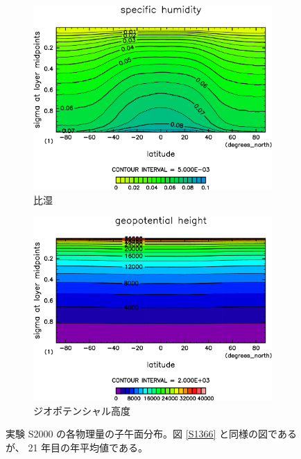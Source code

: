 \documentclass[body]{subfiles}
\begin{document}
\begin{figure}[t]
\begin{subfigure}{.4\textwidth}
		\includegraphics[width=\textwidth]{S2000/QH2OVap,time=7300:7665-crop-rotate.pdf}
		\caption{比湿\hmu*{[kg/kg]}}\label{S2000比湿}
	\end{subfigure}
	\begin{subfigure}{.4\textwidth}
		\centering
		\includegraphics[width=\textwidth]{S2000/Height,time=7300:7665-crop-rotate.pdf}
		\caption{ジオポテンシャル高度\hmu*{[m]}}\label{S2000ジオポテンシャル高度}
	\end{subfigure}
	\caption[実験 S2000 の各物理量の子午面分布]{
		実験 S2000 の各物理量の子午面分布。図 \ref{S1366} と同様の図であるが、
		21 年目の年平均値である。
	}\label{S2000}
\end{figure}
\end{document}
